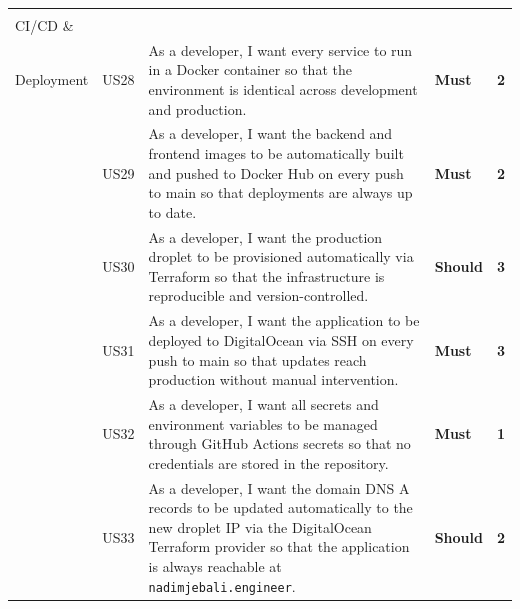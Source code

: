 \documentclass[12pt, a4paper, oneside]{report}
\begin{document}
\begin{longtable}{|>{\centering\arraybackslash\small}p{2.2cm}|>{\centering\arraybackslash\small}p{0.9cm}|>{\small}p{7.6cm}|>{\centering\arraybackslash\small}p{1.4cm}|>{\centering\arraybackslash\small}p{0.7cm}|}
  \cellcolor{featCICD}\makecell[c]{\textbf{F8}\\\small CI/CD \&\\Deployment}
  & US28 & As a developer, I want every service to run in a Docker container so that the environment is identical across development and production.
  & \cellcolor{moscowMust}\textbf{Must} & \cellcolor{complexMed}\textbf{2} \\\hline
  \cellcolor{featCICD}~
  & US29 & As a developer, I want the backend and frontend images to be automatically built and pushed to Docker Hub on every push to main so that deployments are always up to date.
  & \cellcolor{moscowMust}\textbf{Must} & \cellcolor{complexMed}\textbf{2} \\\hline
  \cellcolor{featCICD}~
  & US30 & As a developer, I want the production droplet to be provisioned automatically via Terraform so that the infrastructure is reproducible and version-controlled.
  & \cellcolor{moscowShould}\textbf{Should} & \cellcolor{complexHigh}\textbf{3} \\\hline
  \cellcolor{featCICD}~
  & US31 & As a developer, I want the application to be deployed to DigitalOcean via SSH on every push to main so that updates reach production without manual intervention.
  & \cellcolor{moscowMust}\textbf{Must} & \cellcolor{complexHigh}\textbf{3} \\\hline
  \cellcolor{featCICD}~
  & US32 & As a developer, I want all secrets and environment variables to be managed through GitHub Actions secrets so that no credentials are stored in the repository.
  & \cellcolor{moscowMust}\textbf{Must} & \cellcolor{complexLow}\textbf{1} \\\hline
  \cellcolor{featCICD}~
  & US33 & As a developer, I want the domain DNS A records to be updated automatically to the new droplet IP via the DigitalOcean Terraform provider so that the application is always reachable at \texttt{nadimjebali.engineer}.
  & \cellcolor{moscowShould}\textbf{Should} & \cellcolor{complexMed}\textbf{2} \\

\end{longtable}
\end{document}
